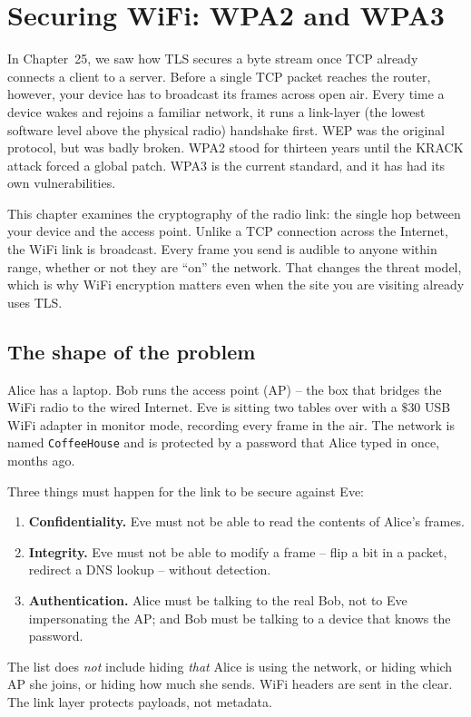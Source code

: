 \chapter{Securing WiFi: WPA2 and WPA3}

In Chapter~25, we saw how TLS secures a byte stream once TCP already connects a client to
a server. Before a single TCP packet reaches the router, however, your device has to
broadcast its frames across open air. Every time a device wakes and rejoins a familiar
network, it runs a link-layer (the lowest software level above the physical radio) handshake first.  WEP was the original protocol, but was badly broken. WPA2 stood for
thirteen years until the KRACK attack forced a global patch. WPA3 is the current standard,
and it has had its own vulnerabilities.

This chapter examines the cryptography of the radio link: the single hop between your device and the access point. Unlike a TCP connection across the Internet, the WiFi link is broadcast. Every frame you send is audible to anyone within range, whether or not they are ``on'' the network. That changes the threat model, which is why WiFi encryption matters even when the site you are visiting already uses TLS.

\chapterline

\section{The shape of the problem}

\begin{intuitionbox}
Alice has a laptop. Bob runs the access point (AP) -- the box that bridges the
WiFi radio to the wired Internet. Eve is sitting two tables over with a $\$30$
USB WiFi adapter in monitor mode, recording every frame in the air. The network
is named \texttt{CoffeeHouse} and is protected by a password that Alice typed in
once, months ago.

Three things must happen for the link to be secure against Eve:
\begin{enumerate}
  \item \textbf{Confidentiality.} Eve must not be able to read the contents of
        Alice's frames.
  \item \textbf{Integrity.} Eve must not be able to modify a frame -- flip a bit
        in a packet, redirect a DNS lookup -- without detection.
  \item \textbf{Authentication.} Alice must be talking to the real Bob, not to
        Eve impersonating the AP; and Bob must be talking to a device that knows
        the password.
\end{enumerate}
The list does \emph{not} include hiding \emph{that} Alice is using the
network, or hiding which AP she joins, or hiding how much she sends. WiFi headers
are sent in the clear. The link layer protects payloads, not metadata.
\end{intuitionbox}

